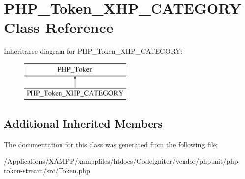 \hypertarget{class_p_h_p___token___x_h_p___c_a_t_e_g_o_r_y}{}\section{P\+H\+P\+\_\+\+Token\+\_\+\+X\+H\+P\+\_\+\+C\+A\+T\+E\+G\+O\+RY Class Reference}
\label{class_p_h_p___token___x_h_p___c_a_t_e_g_o_r_y}
Inheritance diagram for P\+H\+P\+\_\+\+Token\+\_\+\+X\+H\+P\+\_\+\+C\+A\+T\+E\+G\+O\+RY\+:\begin{figure}[H]
\begin{center}
\leavevmode
\includegraphics[height=2.000000cm]{class_p_h_p___token___x_h_p___c_a_t_e_g_o_r_y}
\end{center}
\end{figure}
\subsection*{Additional Inherited Members}


The documentation for this class was generated from the following file\+:\begin{DoxyCompactItemize}
\item 
/\+Applications/\+X\+A\+M\+P\+P/xamppfiles/htdocs/\+Code\+Igniter/vendor/phpunit/php-\/token-\/stream/src/\mbox{\hyperlink{_token_8php}{Token.\+php}}\end{DoxyCompactItemize}
